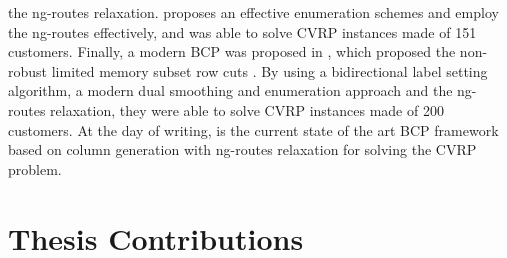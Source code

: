 the ng-routes relaxation.
\textcite{contardo2014} proposes an effective enumeration schemes and employ the ng-routes effectively,
and was able to solve CVRP instances made of 151 customers.
Finally, a modern BCP was proposed in \textcite{pecin2017}, which
proposed the non-robust limited memory subset row cuts \parencite{pecin2017a}.
By using a bidirectional label setting algorithm, a modern dual smoothing and enumeration
approach and the ng-routes relaxation, they were able to solve CVRP
instances made of 200 customers.
At the day of writing, \textcite{pessoa2020a} is the current state of the
art BCP framework based on column generation with ng-routes relaxation
for solving the CVRP problem.






\begin{comment}
\cite{jepsen_branch-and-cut_2011}

Before 1980 very few exact algorithms for cvrp and vrptw had been
proposed, but in the early 1980s two new exact methods where proposed.
From this point the history of exact methods for cvrp and vrptw can
be divided into three phases. The first phase was the introduction of the
Set Partition and the development of Branch-and-Cut-and-Price (bp) algo-
rithms using a relaxed pricing problem. The second was the development of
Branch-and-Cut (bac) algorithms. In the current phase the pricing problem
is no longer relaxed and cuts in the master problem of the Branch-and-Cut-
and-Price algorithms is used. The first two phases where started at the same
point in time and there is still development on the algorithms in the context
of cvrp and vrptw. The algorithms from these two phases are also used
on several other variants of the Vehicle Routing Problem. The third phase
was started in the middle of the 2000s and the algorithms from this phase
are currently the best overall performing algorithms.
\end{comment}

\section{Thesis Contributions}
\label{sec:intro-thesis-contributions}

